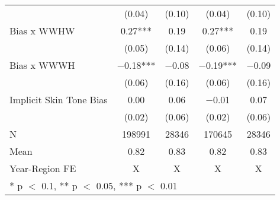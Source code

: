 \begin{longtable}[t]{lcccc}
 & (\num{0.04}) & (\num{0.10}) & (\num{0.04}) & (\num{0.10})\\
Bias x WWHW & \num{0.27}*** & \num{0.19} & \num{0.27}*** & \num{0.19}\\
 & (\num{0.05}) & (\num{0.14}) & (\num{0.06}) & (\num{0.14})\\
Bias x WWWH & \num{-0.18}*** & \num{-0.08} & \num{-0.19}*** & \num{-0.09}\\
 & (\num{0.06}) & (\num{0.16}) & (\num{0.06}) & (\num{0.16})\\
Implicit Skin Tone Bias & \num{0.00} & \num{0.06} & \num{-0.01} & \num{0.07}\\
 & (\num{0.02}) & (\num{0.06}) & (\num{0.02}) & (\num{0.06})\\
\midrule
N & \num{198991} & \num{28346} & \num{170645} & \num{28346}\\
Mean & \num{0.82} & \num{0.83} & \num{0.82} & \num{0.83}\\
Year-Region FE & X & X & X & X\\*
\multicolumn{5}{l}{\rule{0pt}{1em}* p $<$ 0.1, ** p $<$ 0.05, *** p $<$ 0.01}\\
\end{longtable}
